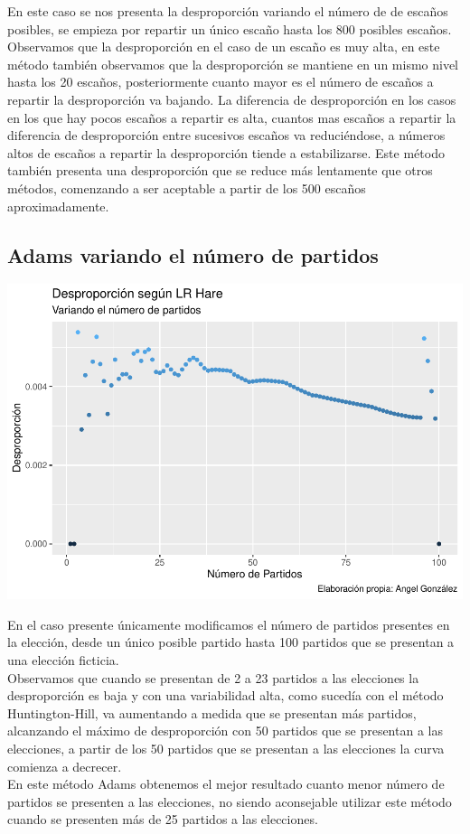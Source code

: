 \documentclass[12pt,a4paper,]{book}
\numberwithin{dummy}{section}
\theoremstyle{ocrenumbox}
\theoremstyle{blacknumex}
\theoremstyle{blacknumbox}
\theoremstyle{ocrenum}
\theoremstyle{ocrenum}
\begin{document}
En este caso se nos presenta la desproporción variando el número de de
escaños posibles, se empieza por repartir un único escaño hasta los 800
posibles escaños. Observamos que la desproporción en el caso de un
escaño es muy alta, en este método también observamos que la
desproporción se mantiene en un mismo nivel hasta los 20 escaños,
posteriormente cuanto mayor es el número de escaños a repartir la
desproporción va bajando. La diferencia de desproporción en los casos en
los que hay pocos escaños a repartir es alta, cuantos mas escaños a
repartir la diferencia de desproporción entre sucesivos escaños va
reduciéndose, a números altos de escaños a repartir la desproporción
tiende a estabilizarse. Este método también presenta una desproporción
que se reduce más lentamente que otros métodos, comenzando a ser
aceptable a partir de los 500 escaños aproximadamente.

\hypertarget{adams-variando-el-nuxfamero-de-partidos}{%
\subsection{Adams variando el número de
partidos}\label{adams-variando-el-nuxfamero-de-partidos}}

\begin{center}\includegraphics[width=0.95\linewidth]{figurasR/unnamed-chunk-42-1} \end{center}

En el caso presente únicamente modificamos el número de partidos
presentes en la elección, desde un único posible partido hasta 100
partidos que se presentan a una elección ficticia.\\
Observamos que cuando se presentan de 2 a 23 partidos a las elecciones
la desproporción es baja y con una variabilidad alta, como sucedía con
el método Huntington-Hill, va aumentando a medida que se presentan más
partidos, alcanzando el máximo de desproporción con 50 partidos que se
presentan a las elecciones, a partir de los 50 partidos que se presentan
a las elecciones la curva comienza a decrecer.\\
En este método Adams obtenemos el mejor resultado cuanto menor número de
partidos se presenten a las elecciones, no siendo aconsejable utilizar
este método cuando se presenten más de 25 partidos a las elecciones.
\end{document}
